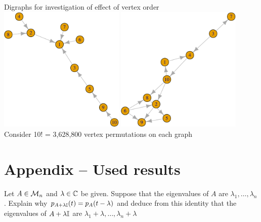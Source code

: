 \documentclass[aspectratio=169]{beamer}
\renewcommand{\thetheorem}{8.\arabic{theorem}}
\begin{document}
\begin{frame}{Digraphs for investigation of effect of vertex order}
	\includegraphics[width=0.45\textwidth]{graph_10v_BA}
	\quad
	\includegraphics[width=0.45\textwidth]{graph_10v_ER}
	\vfill
	Consider 10! = 3,628,800 vertex permutations on each graph
\end{frame}



\appendix
\section{Appendix -- Used results}
\setcounter{theorem}{0}
\renewcommand{\thetheorem}{A.\arabic{theorem}}

\begin{frame}{\cite{HornJohnson2013}}
	\begin{theorem}
		\label{th:HJ_problem_1_2_P8}
		Let $A\in\mathcal{M}_n$ and $\lambda\in\mathbb{C}$ be given. 
		Suppose that the eigenvalues of $A$ are $\lambda_1,\ldots,\lambda_n$.
		Explain why $p_{A+\lambda\mathbb{I}}(t)=p_A(t-\lambda)$ and deduce from this identity that the eigenvalues of $A+\lambda\mathbb{I}$ are $\lambda_1+\lambda,\ldots,\lambda_n+\lambda$
	\end{theorem}
\end{frame}
\end{document}
